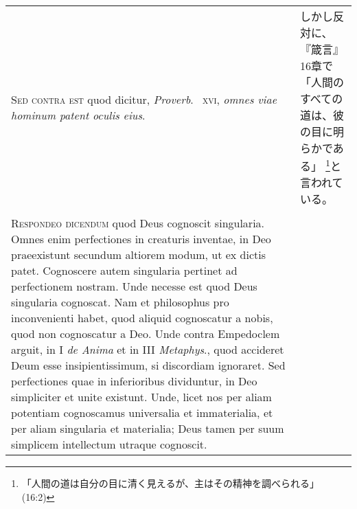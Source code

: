 \documentclass[10pt]{jsarticle} %
\begin{document}
\begin{longtable}{p{21em}p{21em}}
{\scshape Sed contra est} quod dicitur, {\itshape Proverb}.~{\scshape
xvi}, {\itshape omnes viae hominum patent oculis eius}.

&

しかし反対に、『箴言』16章で「人間のすべての道は、彼の目に明らかである」
\footnote{「人間の道は自分の目に清く見えるが、主はその精神を調べられる」
(16:2)}と言われている。

\\
\\

{\scshape Respondeo dicendum} quod Deus cognoscit singularia. Omnes
enim perfectiones in creaturis inventae, in Deo praeexistunt secundum
altiorem modum, ut ex dictis patet. Cognoscere autem singularia
pertinet ad perfectionem nostram. Unde necesse est quod Deus
singularia cognoscat. Nam et philosophus pro inconvenienti habet, quod
aliquid cognoscatur a nobis, quod non cognoscatur a Deo. Unde contra
Empedoclem arguit, in I {\itshape de Anima} et in III {\itshape
Metaphys}., quod accideret Deum esse insipientissimum, si discordiam
ignoraret. Sed perfectiones quae in inferioribus dividuntur, in Deo
simpliciter et unite existunt. Unde, licet nos per aliam potentiam
cognoscamus universalia et immaterialia, et per aliam singularia et
materialia; Deus tamen per suum simplicem intellectum utraque
cognoscit.


&


\end{longtable}
\end{document}
